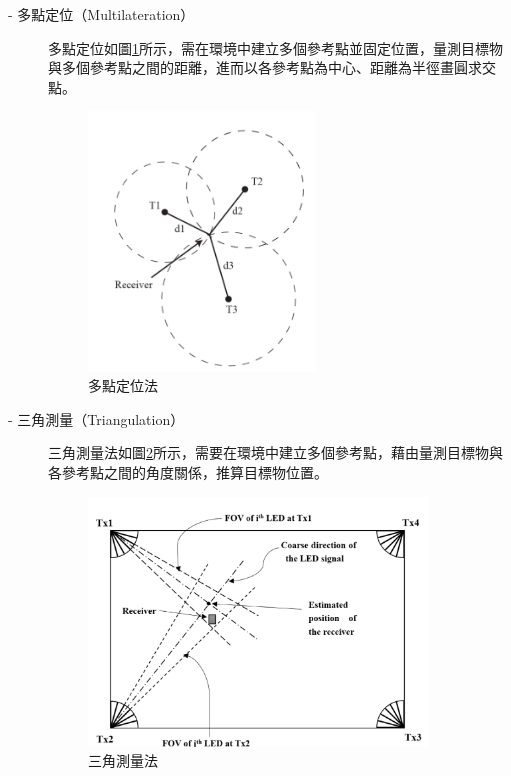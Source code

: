     \begin{description}
        \item[- 多點定位（Multilateration）]\hfill 
        
        \qquad
        多點定位如圖\ref{pic:multilateration}所示，需在環境中建立多個參考點並固定位置，量測目標物與多個參考點之間的距離，進而以各參考點為中心、距離為半徑畫圓求交點。

        \begin{figure}[htpb]
            \centering
            \includegraphics[width=6cm]{ch2pic/multilateration.png}
            \caption{多點定位法\cite{survey_light2020}}
            \label{pic:multilateration}
        \end{figure}
    
        \item[- 三角測量（Triangulation）] \hfill 
        
        \qquad
        三角測量法如圖\ref{pic:triangulation}所示，需要在環境中建立多個參考點，藉由量測目標物與各參考點之間的角度關係，推算目標物位置。
        \begin{figure}[htpb]
            \centering
            \includegraphics[width=9cm]{ch2pic/triangulation.png}
            \caption{三角測量法\cite{survey_light2018}}
            \label{pic:triangulation}
        \end{figure}
        

\end{description}
